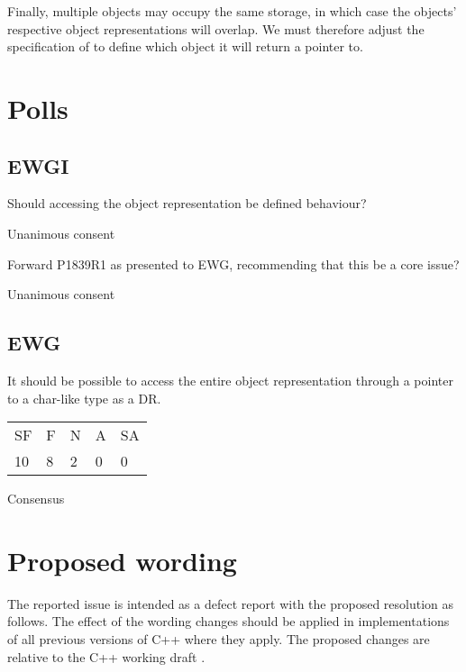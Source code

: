 Finally, multiple objects may occupy the same storage, in which case the objects' respective object representations will overlap. We must therefore adjust the specification of  to define which object it will return a pointer to.


\section {Polls}
\label{sec:polls}

\subsection*{EWGI}

Should accessing the object representation be defined behaviour?

\hspace{6mm}Unanimous consent

Forward P1839R1 as presented to EWG, recommending that this be a core issue?

\hspace{6mm}Unanimous consent

\subsection*{EWG}

It should be possible to access the entire object representation through a pointer to a char-like type as a DR.

\hspace{6mm}
\begin{tabular}{lllll}
  SF & F & N & A & SA \\
  10 & 8 & 2 & 0 & 0
\end{tabular}
\hspace{5mm}Consensus

\section{Proposed wording}
\label{sec:wording}

The reported issue is intended as a defect report with the proposed resolution as follows. The effect
of the wording changes should be applied in implementations of all previous versions of C++ where
they apply. The proposed changes are relative to the C++ working draft \cite{N4910}.

